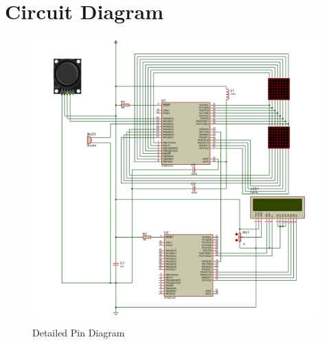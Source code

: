 \documentclass[12pt]{article}
\begin{document}
\section{Circuit Diagram}
    \begin{figure}[ht]
        \centering
        \includegraphics[width = \textwidth]{circuit_final1.pdf}
        \caption{Detailed Pin Diagram}
        \label{fig:circuit}
    \end{figure}
\end{document}
